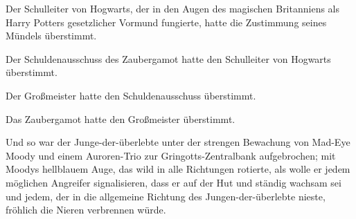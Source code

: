 Der Schulleiter von Hogwarts, der in den Augen des magischen Britanniens als Harry Potters gesetzlicher Vormund fungierte, hatte die Zustimmung seines Mündels überstimmt.

Der Schuldenausschuss des Zaubergamot hatte den Schulleiter von Hogwarts überstimmt.

Der Großmeister hatte den Schuldenausschuss überstimmt.

Das Zaubergamot hatte den Großmeister überstimmt.

Und so war der Junge-der-überlebte unter der strengen Bewachung von Mad-Eye Moody und einem Auroren-Trio zur Gringotts-Zentralbank aufgebrochen; mit Moodys hellblauem Auge, das wild in alle Richtungen rotierte, als wolle er jedem möglichen Angreifer signalisieren, dass er auf der Hut und ständig wachsam sei und jedem, der in die allgemeine Richtung des Jungen-der-überlebte nieste, fröhlich die Nieren verbrennen würde.

